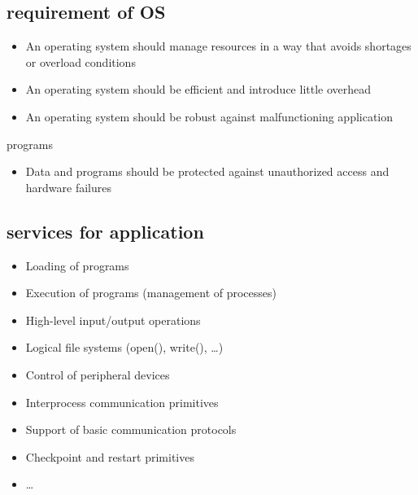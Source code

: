 \documentclass[11pt]{article}
\begin{document}
\subsection{requirement of OS}
\label{sec:org07bc1a0}
\begin{itemize}
\item An operating system should manage resources in a way that avoids shortages or overload conditions
\item An operating system should be efficient and introduce little overhead
\item An operating system should be robust against malfunctioning application
\end{itemize}
programs
\begin{itemize}
\item Data and programs should be protected against unauthorized access and hardware failures
\end{itemize}
\subsection{services for application}
\label{sec:org9a255c1}
\begin{itemize}
\item Loading of programs
\item Execution of programs (management of processes)
\item High-level input/output operations
\item Logical file systems (open(), write(), \ldots{})
\item Control of peripheral devices
\item Interprocess communication primitives
\item Support of basic communication protocols
\item Checkpoint and restart primitives
\item \ldots{}
\end{itemize}
\end{document}
